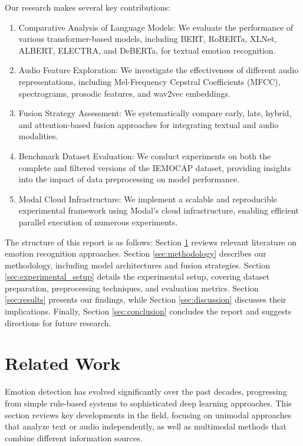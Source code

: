 \documentclass[12pt]{article}
\begin{document}
Our research makes several key contributions:

\begin{enumerate}
    \item Comparative Analysis of Language Models: We evaluate the performance of various transformer-based models, including BERT, RoBERTa, XLNet, ALBERT, ELECTRA, and DeBERTa, for textual emotion recognition.
    
    \item Audio Feature Exploration: We investigate the effectiveness of different audio representations, including Mel-Frequency Cepstral Coefficients (MFCC), spectrograms, prosodic features, and wav2vec embeddings.
    
    \item Fusion Strategy Assessment: We systematically compare early, late, hybrid, and attention-based fusion approaches for integrating textual and audio modalities.
    
    \item Benchmark Dataset Evaluation: We conduct experiments on both the complete and filtered versions of the IEMOCAP dataset, providing insights into the impact of data preprocessing on model performance.
    
    \item Modal Cloud Infrastructure: We implement a scalable and reproducible experimental framework using Modal's cloud infrastructure, enabling efficient parallel execution of numerous experiments.
\end{enumerate}

The structure of this report is as follows: Section \ref{sec:related} reviews relevant literature on emotion recognition approaches. Section \ref{sec:methodology} describes our methodology, including model architectures and fusion strategies. Section \ref{sec:experimental_setup} details the experimental setup, covering dataset preparation, preprocessing techniques, and evaluation metrics. Section \ref{sec:results} presents our findings, while Section \ref{sec:discussion} discusses their implications. Finally, Section \ref{sec:conclusion} concludes the report and suggests directions for future research.

\section{Related Work}
\label{sec:related}
Emotion detection has evolved significantly over the past decades, progressing from simple rule-based systems to sophisticated deep learning approaches. This section reviews key developments in the field, focusing on unimodal approaches that analyze text or audio independently, as well as multimodal methods that combine different information sources.
\end{document}
